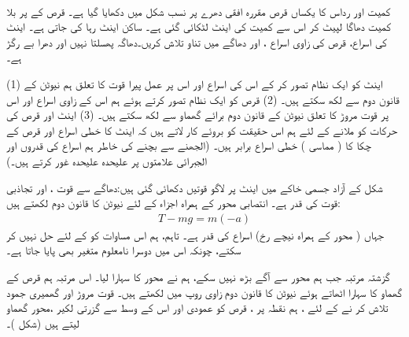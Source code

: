 \\
کمیت   اور رداس  کا یکساں قرص مقررہ افقی دھرے پر نسب  شکل  میں دکھایا گیا ہے۔ قرص کے پر بلا کمیت  دھاگا لپیٹ کر اس سے   کمیت  کی اینٹ لٹکائی گئی ہے۔ ساکن اینٹ رہا کی جاتی ہے۔ اینٹ کی اسراع، قرص کی زاوی  اسراع ، اور دھاگے میں تناو تلاش کریں۔دھاگہ پھسلتا  نہیں  اور دھرا   بے رگڑ ہے۔

(1)  اینٹ کو ایک نظام تصور کر کے اس کی اسراع  اور اس پر عمل پیرا قوت کا تعلق ہم نیوٹن کے قانون دوم  سے لکھ سکتے ہیں۔
(2) قرص کو ایک نظام تصور کرتے ہوئے ہم اس کے  زاوی اسراع    اور  اس پر قوت مروڑ   کا تعلق  نیوٹن کے قانون دوم برائے گھماو   سے لکھ سکتے ہیں۔ (3)  اینٹ اور قرص  کی حرکات  کو ملانے کے لئے ہم اس حقیقت کو بروئے کار لاتے ہیں کہ اینٹ کا  خطی اسراع  اور قرص کے    چکا   کا (  مماسی ) خطی  اسراع    برابر ہیں۔ (الجھنے سے بچنے کی خاطر ہم اسراع  کی قدروں اور الجبرائی  علامتوں  پر علیحدہ علیحدہ غور کرتے ہیں۔)

\quad
شکل  کے  آزاد جسمی  خاکے  میں اینٹ پر لاگو قوتیں  دکھائی گئی ہیں:دھاگے سے قوت ، اور تجاذبی قوت  کی قدر  ہے۔    انتصابی   محور کے ہمراہ  اجزاء کے لئے نیوٹن کا قانون دوم   لکھتے ہیں:
\begin{align}\label{مساوات_گھماو_نمونی_قرص_مروڑ}
T-mg=m(-a)
\end{align}
جہاں (  محور  کے ہمراہ نیچے رخ)  اسراع  کی قدر  ہے۔ تاہم،   ہم اس  مساوات کو  کے لئے حل نہیں کر سکتے، چونکہ اس میں دوسرا نامعلوم متغیر  بھی پایا جاتا ہے۔

\quad
گزشتہ مرتبہ جب ہم محور   سے آگے بڑھ نہیں سکے، ہم  نے محور  کا سہارا لیا۔ اس مرتبہ ہم قرص کے گھماو کا سہارا اٹھاتے  ہوئے نیوٹن کا قانون دوم  زاوی روپ میں لکھتے ہیں۔ قوت مروڑ اور گھمیری جمود   تلاش کر نے کے لئے ، ہم نقطہ  پر ، قرص کو عمودی اور اس  کے وسط سے گزرتی لکیر  ،محور گھماو  لیتے ہیں (شکل )۔

